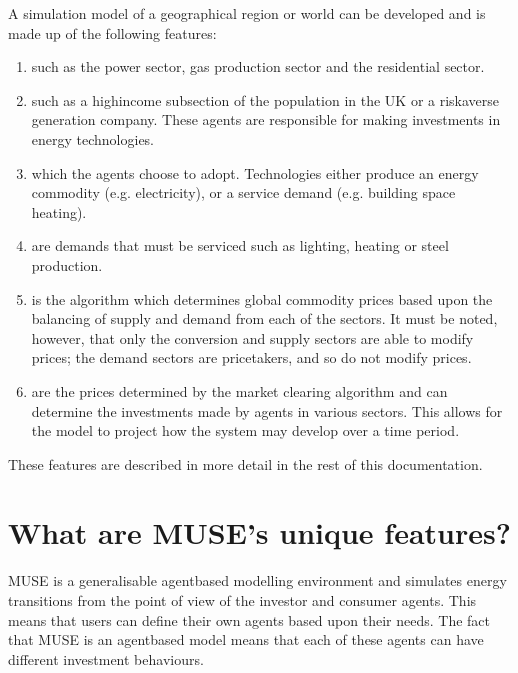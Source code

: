\documentclass[letterpaper,10pt,english]{sphinxmanual}
\begin{document}
A simulation model of a geographical region or world can be developed and is made up of the following features:
\begin{enumerate}
%
\item {} 
 such as the power sector, gas production sector and the residential sector.

\item {} 
 such as a high\sphinxhyphen{}income subsection of the population in the UK or a risk\sphinxhyphen{}averse generation company. These agents are responsible for making investments in energy technologies.

\item {} 
 which the agents choose to adopt. Technologies either produce an energy commodity (e.g. electricity), or a service demand (e.g. building space heating).

\item {} 
 are demands that must be serviced such as lighting, heating or steel production.

\item {} 
 is the algorithm which determines global commodity prices based upon the balancing of supply and demand from each of the sectors. It must be noted, however, that only the conversion and supply sectors are able to modify prices; the demand sectors are price\sphinxhyphen{}takers, and so do not modify prices.

\item {} 
 are the prices determined by the market clearing algorithm and can determine the investments made by agents in various sectors. This allows for the model to project how the system may develop over a time period.

\end{enumerate}

These features are described in more detail in the rest of this documentation.


\section{What are MUSE’s unique features?}
\label{\detokenize{overview:what-are-muse-s-unique-features}}
MUSE is a generalisable agent\sphinxhyphen{}based modelling environment and simulates energy transitions from the point of view of the investor and consumer agents. This means that users can define their own agents based upon their needs. The fact that MUSE is an agent\sphinxhyphen{}based model means that each of these agents can have different investment behaviours.
\end{document}
